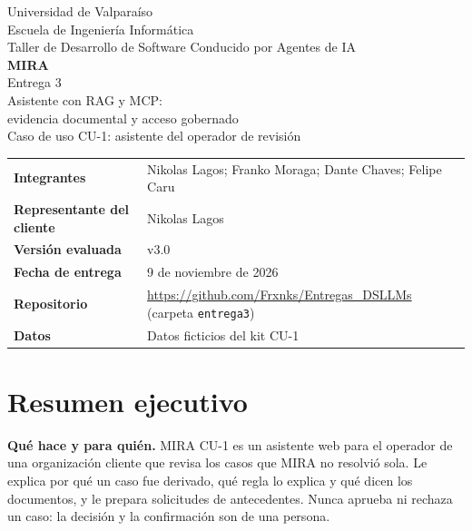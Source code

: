 \documentclass[11pt,a4paper]{article}
\newcommand{\codigo}[1]{\texttt{\small #1}}
\begin{document}
\pagestyle{plain}

\begin{titlepage}
\centering
{\large Universidad de Valparaíso}\\[2pt]
{\large Escuela de Ingeniería Informática}\\[2pt]
{\large Taller de Desarrollo de Software Conducido por Agentes de IA}\\[26pt]
{\Huge\bfseries\color{azulmira} MIRA}\\[7pt]
{\LARGE Entrega 3}\\[5pt]
{\Large Asistente con RAG y MCP:\\ evidencia documental y acceso gobernado}\\[6pt]
{\large Caso de uso CU-1: asistente del operador de revisión}\\[26pt]
\begin{tabularx}{0.9\textwidth}{@{}>{\bfseries}p{4.4cm}Y@{}}
Integrantes & Nikolas Lagos; Franko Moraga; Dante Chaves; Felipe Caru\\
Representante del cliente & Nikolas Lagos\\
Versión evaluada & v3.0\\
Fecha de entrega & 9 de noviembre de 2026\\
Repositorio & \url{https://github.com/Frxnks/Entregas_DSLLMs} (carpeta \codigo{entrega3})\\
Datos & Datos ficticios del kit CU-1\\
\end{tabularx}
\vfill
{}
\vfill
\end{titlepage}

\tableofcontents
\clearpage

\section{Resumen ejecutivo}
\textbf{Qué hace y para quién.} MIRA CU-1 es un asistente web para el operador de una organización cliente que revisa los casos que MIRA no resolvió sola. Le explica por qué un caso fue derivado, qué regla lo explica y qué dicen los documentos, y le prepara solicitudes de antecedentes. Nunca aprueba ni rechaza un caso: la decisión y la confirmación son de una persona.
\end{document}
